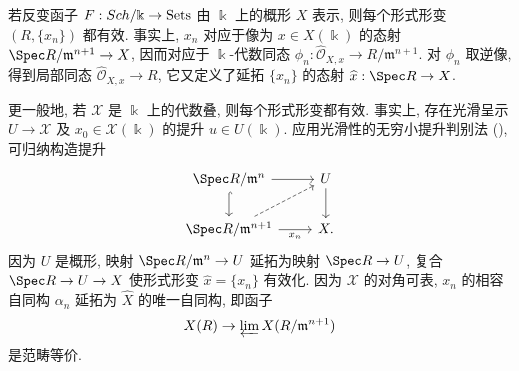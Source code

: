 \begin{example}\label{src:C.5.2}
若反变函子 $F:\Sch/\Bbbk\to\mathrm{Sets}$ 由 $\Bbbk$ 上的概形 $X$ 表示, 则每个形式形变 $(R,\{x_n\})$ 都有效. 事实上, $x_n$ 对应于像为 $x\in X(\Bbbk)$ 的态射 $\Spec R/\mathfrak m^{n+1}\to X$, 因而对应于 $\Bbbk$-代数同态 $\phi_n:\widehat{\mathcal O}_{X,x}\to R/\mathfrak m^{n+1}$. 对 $\phi_n$ 取逆像, 得到局部同态 $\widehat{\mathcal O}_{X,x}\to R$, 它又定义了延拓 $\{x_n\}$ 的态射 $\widehat x:\Spec R\to X$.

更一般地, 若 $\mathcal X$ 是 $\Bbbk$ 上的代数叠, 则每个形式形变都有效. 事实上, 存在光滑呈示 $U\to\mathcal X$ 及 $x_0\in\mathcal X(\Bbbk)$ 的提升 $u\in U(\Bbbk)$. 应用光滑性的无穷小提升判别法 (), 可归纳构造提升
\[
\begin{tikzcd}
\Spec R/\mathfrak m^n\arrow[r]\arrow[d,hook]&U\arrow[d]\\
\Spec R/\mathfrak m^{n+1}\arrow[r,"x_n"']\arrow[ur,dashed]&\mathcal X.
\end{tikzcd}
\]
因为 $U$ 是概形, 映射 $\Spec R/\mathfrak m^n\to U$ 延拓为映射 $\Spec R\to U$, 复合 $\Spec R\to U\to\mathcal X$ 使形式形变 $\widehat x=\{x_n\}$ 有效化. 因为 $\mathcal X$ 的对角可表, $x_n$ 的相容自同构 $\alpha_n$ 延拓为 $\widehat X$ 的唯一自同构, 即函子
\[
\mathcal X(R)\to\varprojlim\mathcal X(R/\mathfrak m^{n+1})
\]
是范畴等价.
\end{example}


